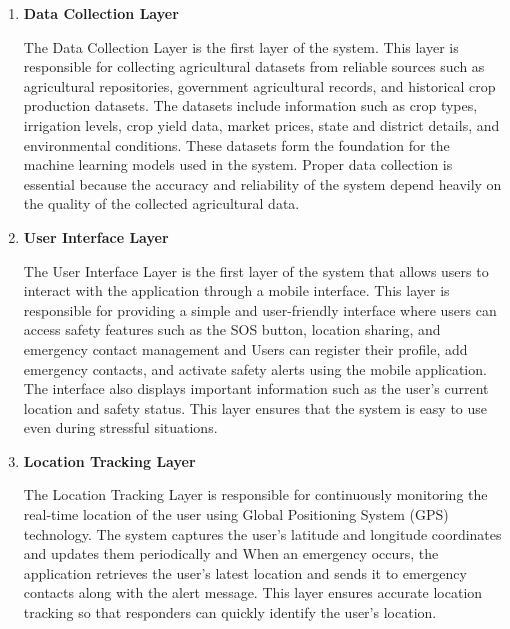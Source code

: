 \documentclass[a4paper,12pt]{report}
\begin{document}
\begin{enumerate}

\item \textbf{Data Collection Layer}

\par The Data Collection Layer is the first layer of the system. This layer is responsible for collecting agricultural datasets from reliable sources such as agricultural repositories, government agricultural records, and historical crop production datasets. The datasets include information such as crop types, irrigation levels, crop yield data, market prices, state and district details, and environmental conditions. These datasets form the foundation for the machine learning models used in the system. Proper data collection is essential because the accuracy and reliability of the system depend heavily on the quality of the collected agricultural data.\\


\item \textbf{User Interface Layer}

\par The User Interface Layer is the first layer of the system that allows users to interact with the application through a mobile interface. This layer is responsible for providing a simple and user-friendly interface where users can access safety features such as the SOS button, location sharing, and emergency contact management and 
Users can register their profile, add emergency contacts, and activate safety alerts using the mobile application. The interface also displays important information such as the user’s current location and safety status. This layer ensures that the system is easy to use even during stressful situations.\\


\item \textbf{Location Tracking Layer}

\par The Location Tracking Layer is responsible for continuously monitoring the real-time location of the user using Global Positioning System (GPS) technology. The system captures the user’s latitude and longitude coordinates and updates them periodically and 
When an emergency occurs, the application retrieves the user’s latest location and sends it to emergency contacts along with the alert message. This layer ensures accurate location tracking so that responders can quickly identify the user’s location.\\



\end{enumerate}
\end{document}
